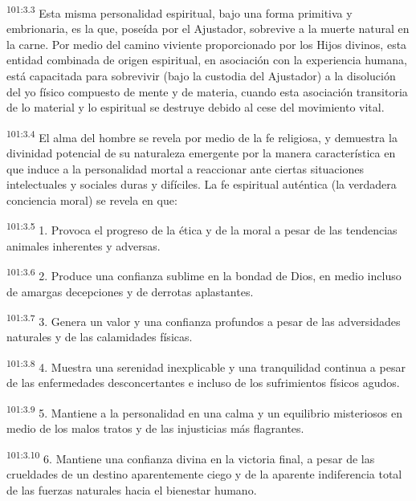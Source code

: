 \documentclass[twoside, 11pt]{book}
\begin{document}
\par
\textsuperscript{101:3.3} Esta misma personalidad espiritual, bajo una forma primitiva y embrionaria, es la que, poseída por el Ajustador, sobrevive a la muerte natural en la carne. Por medio del camino viviente proporcionado por los Hijos divinos, esta entidad combinada de origen espiritual, en asociación con la experiencia humana, está capacitada para sobrevivir (bajo la custodia del Ajustador) a la disolución del yo físico compuesto de mente y de materia, cuando esta asociación transitoria de lo material y lo espiritual se destruye debido al cese del movimiento vital.

\par
\textsuperscript{101:3.4} El alma del hombre se revela por medio de la fe religiosa, y demuestra la divinidad potencial de su naturaleza emergente por la manera característica en que induce a la personalidad mortal a reaccionar ante ciertas situaciones intelectuales y sociales duras y difíciles. La fe espiritual auténtica (la verdadera conciencia moral) se revela en que:

\par
\textsuperscript{101:3.5} 1. Provoca el progreso de la ética y de la moral a pesar de las tendencias animales inherentes y adversas.

\par
\textsuperscript{101:3.6} 2. Produce una confianza sublime en la bondad de Dios, en medio incluso de amargas decepciones y de derrotas aplastantes.

\par
\textsuperscript{101:3.7} 3. Genera un valor y una confianza profundos a pesar de las adversidades naturales y de las calamidades físicas.

\par
\textsuperscript{101:3.8} 4. Muestra una serenidad inexplicable y una tranquilidad continua a pesar de las enfermedades desconcertantes e incluso de los sufrimientos físicos agudos.

\par
\textsuperscript{101:3.9} 5. Mantiene a la personalidad en una calma y un equilibrio misteriosos en medio de los malos tratos y de las injusticias más flagrantes.

\par
\textsuperscript{101:3.10} 6. Mantiene una confianza divina en la victoria final, a pesar de las crueldades de un destino aparentemente ciego y de la aparente indiferencia total de las fuerzas naturales hacia el bienestar humano.
\end{document}

